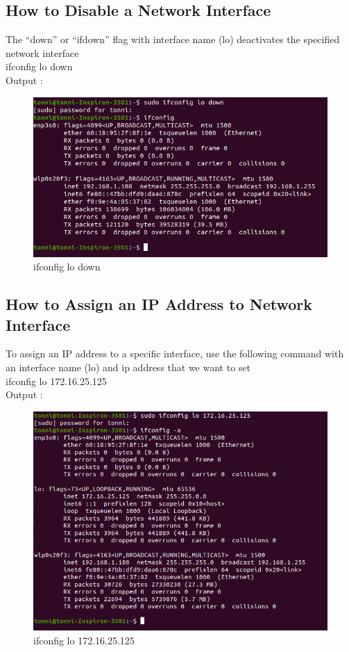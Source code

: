 \documentclass[11pt]{article}
\begin{document}
\subsection{ How to Disable a Network Interface}
The “down” or “ifdown” flag with interface name (lo) deactivates the specified network interface\\[6pt]
  ifconfig lo down\\[12pt]   
        Output : 
  \begin{figure}[!h]
\centering
\includegraphics[width=\textwidth]{down_if.png}
\caption{ifconfig lo down}
\end{figure}
\subsection{ How to Assign an IP Address to Network Interface}
To assign an IP address to a specific interface, use the following command with an interface name (lo) and ip address that we want to set\\[6pt]
  ifconfig lo 172.16.25.125\\[12pt]   
        Output : 
  \begin{figure}[!h]
\centering
\includegraphics[width=\textwidth]{change_ip.png}
\caption{ifconfig lo 172.16.25.125}
\end{figure}
\\[42pt]
\end{document}
